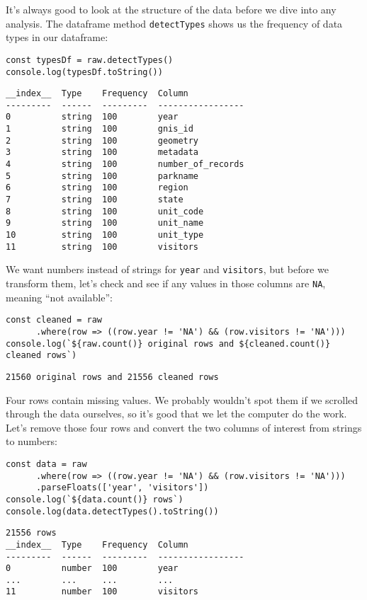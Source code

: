 It's always good to look at the structure of the data
before we dive into any analysis.
The dataframe method \texttt{detectTypes} shows us the frequency of data types in our dataframe:

\begin{verbatim}
const typesDf = raw.detectTypes() 
console.log(typesDf.toString())
\end{verbatim}

\begin{verbatim}
__index__  Type    Frequency  Column
---------  ------  ---------  -----------------
0          string  100        year
1          string  100        gnis_id
2          string  100        geometry
3          string  100        metadata
4          string  100        number_of_records
5          string  100        parkname
6          string  100        region
7          string  100        state
8          string  100        unit_code
9          string  100        unit_name
10         string  100        unit_type
11         string  100        visitors
\end{verbatim}

We want numbers instead of strings for \texttt{year} and \texttt{visitors},
but before we transform them,
let's check and see if any values in those columns are \texttt{NA},
meaning ``not available'':

\begin{verbatim}
const cleaned = raw
      .where(row => ((row.year != 'NA') && (row.visitors != 'NA')))
console.log(`${raw.count()} original rows and ${cleaned.count()} cleaned rows`)
\end{verbatim}

\begin{verbatim}
21560 original rows and 21556 cleaned rows
\end{verbatim}

Four rows contain missing values.
We probably wouldn't spot them if we scrolled through the data ourselves,
so it's good that we let the computer do the work.
Let's remove those four rows and convert the two columns of interest from strings to numbers:

\begin{verbatim}
const data = raw
      .where(row => ((row.year != 'NA') && (row.visitors != 'NA')))
      .parseFloats(['year', 'visitors'])
console.log(`${data.count()} rows`)
console.log(data.detectTypes().toString())
\end{verbatim}

\begin{verbatim}
21556 rows
__index__  Type    Frequency  Column
---------  ------  ---------  -----------------
0          number  100        year
...        ...     ...        ...
11         number  100        visitors
\end{verbatim}

